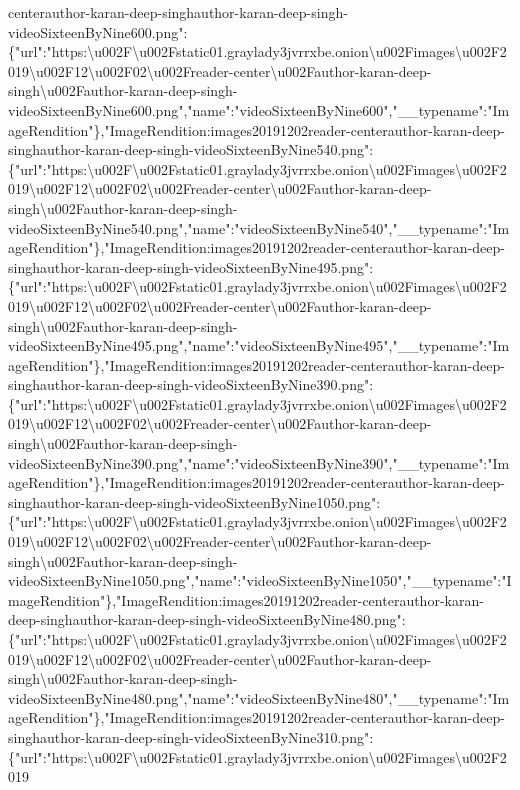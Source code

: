 centerauthor-karan-deep-singhauthor-karan-deep-singh-videoSixteenByNine600.png":\{"url":"https:\textbackslash{}u002F\textbackslash{}u002Fstatic01.graylady3jvrrxbe.onion\textbackslash{}u002Fimages\textbackslash{}u002F2019\textbackslash{}u002F12\textbackslash{}u002F02\textbackslash{}u002Freader-center\textbackslash{}u002Fauthor-karan-deep-singh\textbackslash{}u002Fauthor-karan-deep-singh-videoSixteenByNine600.png","name":"videoSixteenByNine600","\_\_typename":"ImageRendition"\},"ImageRendition:images20191202reader-centerauthor-karan-deep-singhauthor-karan-deep-singh-videoSixteenByNine540.png":\{"url":"https:\textbackslash{}u002F\textbackslash{}u002Fstatic01.graylady3jvrrxbe.onion\textbackslash{}u002Fimages\textbackslash{}u002F2019\textbackslash{}u002F12\textbackslash{}u002F02\textbackslash{}u002Freader-center\textbackslash{}u002Fauthor-karan-deep-singh\textbackslash{}u002Fauthor-karan-deep-singh-videoSixteenByNine540.png","name":"videoSixteenByNine540","\_\_typename":"ImageRendition"\},"ImageRendition:images20191202reader-centerauthor-karan-deep-singhauthor-karan-deep-singh-videoSixteenByNine495.png":\{"url":"https:\textbackslash{}u002F\textbackslash{}u002Fstatic01.graylady3jvrrxbe.onion\textbackslash{}u002Fimages\textbackslash{}u002F2019\textbackslash{}u002F12\textbackslash{}u002F02\textbackslash{}u002Freader-center\textbackslash{}u002Fauthor-karan-deep-singh\textbackslash{}u002Fauthor-karan-deep-singh-videoSixteenByNine495.png","name":"videoSixteenByNine495","\_\_typename":"ImageRendition"\},"ImageRendition:images20191202reader-centerauthor-karan-deep-singhauthor-karan-deep-singh-videoSixteenByNine390.png":\{"url":"https:\textbackslash{}u002F\textbackslash{}u002Fstatic01.graylady3jvrrxbe.onion\textbackslash{}u002Fimages\textbackslash{}u002F2019\textbackslash{}u002F12\textbackslash{}u002F02\textbackslash{}u002Freader-center\textbackslash{}u002Fauthor-karan-deep-singh\textbackslash{}u002Fauthor-karan-deep-singh-videoSixteenByNine390.png","name":"videoSixteenByNine390","\_\_typename":"ImageRendition"\},"ImageRendition:images20191202reader-centerauthor-karan-deep-singhauthor-karan-deep-singh-videoSixteenByNine1050.png":\{"url":"https:\textbackslash{}u002F\textbackslash{}u002Fstatic01.graylady3jvrrxbe.onion\textbackslash{}u002Fimages\textbackslash{}u002F2019\textbackslash{}u002F12\textbackslash{}u002F02\textbackslash{}u002Freader-center\textbackslash{}u002Fauthor-karan-deep-singh\textbackslash{}u002Fauthor-karan-deep-singh-videoSixteenByNine1050.png","name":"videoSixteenByNine1050","\_\_typename":"ImageRendition"\},"ImageRendition:images20191202reader-centerauthor-karan-deep-singhauthor-karan-deep-singh-videoSixteenByNine480.png":\{"url":"https:\textbackslash{}u002F\textbackslash{}u002Fstatic01.graylady3jvrrxbe.onion\textbackslash{}u002Fimages\textbackslash{}u002F2019\textbackslash{}u002F12\textbackslash{}u002F02\textbackslash{}u002Freader-center\textbackslash{}u002Fauthor-karan-deep-singh\textbackslash{}u002Fauthor-karan-deep-singh-videoSixteenByNine480.png","name":"videoSixteenByNine480","\_\_typename":"ImageRendition"\},"ImageRendition:images20191202reader-centerauthor-karan-deep-singhauthor-karan-deep-singh-videoSixteenByNine310.png":\{"url":"https:\textbackslash{}u002F\textbackslash{}u002Fstatic01.graylady3jvrrxbe.onion\textbackslash{}u002Fimages\textbackslash{}u002F2019\text